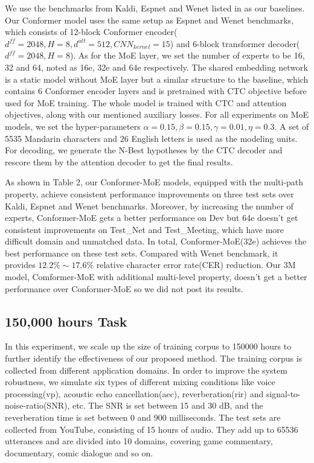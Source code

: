 \documentclass[a4paper]{article}
\begin{document}
We use the benchmarks from Kaldi, Espnet and Wenet listed in \cite{zhang2022wenetspeech} as our baselines. Our Conformer model uses the same setup as Espnet and Wenet benchmarks, which consists of 12-block Conformer encoder($d^{ff}=2048, H=8, d^{att}=512, CNN_{kernel}=15$) and 6-block transformer decoder($ d^{ff}=2048, H=8 $). As for the MoE layer, we set the number of experts to be 16, 32 and 64, noted as 16e, 32e and 64e respectively. The shared embedding network is a static model without MoE layer but a similar structure to the baseline, which contains 6 Conformer encoder layers and is pretrained with CTC objective before used for MoE training. The whole model is trained with CTC and attention objectives, along with our mentioned auxiliary losses. For all experiments on MoE models, we set the hyper-parameters $\alpha=0.15, \beta=0.15, \gamma=0.01, \eta=0.3$. A set of  5535 Mandarin characters and 26 English letters is used as the modeling units. For decoding, we generate the N-Best hypotheses by the CTC decoder and rescore them by the attention decoder to get the final results.

As shown in Table 2, our Conformer-MoE models, equipped with the multi-path property, achieve consistent performance improvements on three test sets over Kaldi, Espnet and Wenet benchmarks. Moreover, by increasing the number of experts, Conformer-MoE gets a better performance on Dev but 64e doesn't get consistent improvements on Test\_Net and Test\_Meeting, which have more difficult domain and unmatched data. In total, Conformer-MoE(32e) achieves the best performance on these test sets. Compared with Wenet benchmark, it provides $12.2\% \sim 17.6\%$ relative character error rate(CER) reduction. Our 3M model, Comformer-MoE with additional multi-level property, doesn't get a better performance over Conformer-MoE so we did not post its results. 










\subsection{150,000 hours Task}
In this experiment, we scale up the size of training corpus to 150000 hours to further identify the effectiveness of our proposed method. The training corpus is collected from different application domains. In order to improve the system robustness, we simulate six types of different mixing conditions like voice processing(vp), acoustic echo cancellation(aec), reverberation(rir) and signal-to-noise-ratio(SNR), etc. The SNR is set between 15 and 30 dB, and the reverberation time is set between 0 and 900 milliseconds. The test sets are collected from YouTube, consisting of 15 hours of audio. They add up to 65536 utterances and are divided into 10 domains, covering game commentary, documentary, comic dialogue and so on.
\end{document}
